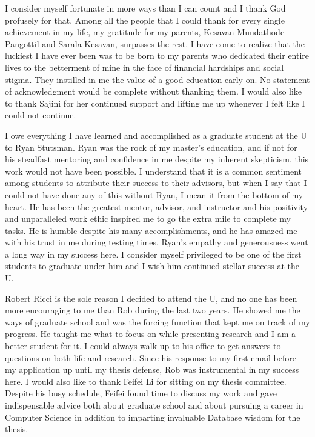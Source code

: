 I consider myself fortunate in more ways than I can count and I thank God profusely for that. 
Among all the people that I could thank for every single achievement in my life, my gratitude for my parents, Kesavan Mundathode Pangottil and Sarala Kesavan, surpasses the rest. 
I have come to realize that the luckiest I have ever been was to be born to my parents who dedicated their entire lives to the betterment of mine in the face of financial hardships and social stigma. 
They instilled in me the value of a good education early on. No statement of acknowledgment would be complete without thanking them. I would also like to thank Sajini for her continued support and lifting 
me up whenever I felt like I could not continue.

I owe everything I have learned and accomplished as a graduate student at the U to Ryan Stutsman. 
Ryan was the rock of my master's education, and if not for his steadfast mentoring and confidence in me despite my inherent skepticism, this work would not have been possible. 
I understand that it is a common sentiment among students to attribute their success to their advisors, but when I say that I could not have done any of this without Ryan, I mean it from the bottom of my heart. 
He has been the greatest mentor, advisor, and instructor and his positivity and unparalleled work ethic inspired me to go the extra mile to complete my tasks. 
He is humble despite his many accomplishments, and he has amazed me with his trust in me during testing times. 
Ryan's empathy and generousness went a long way in my success here. 
I consider myself privileged to be one of the first students to graduate under him and I wish him continued stellar success at the U.

Robert Ricci is the sole reason I decided to attend the U, and no one has been more \linebreak encouraging to me than Rob during the last two years.
He showed me the ways of \linebreak graduate school and was the forcing function that kept me on track of my progress. 
He taught me what to focus on while presenting research and I am a better student for it.\linebreak 
I could always walk up to his office to get answers to questions on both life and research. 
Since his response to my first email before my application up until my thesis defense, \linebreak Rob was instrumental in my success here. 
I would also like to thank Feifei Li for sitting on my thesis committee. Despite his busy schedule, Feifei found time to discuss my work and gave indispensable advice both about graduate school and about pursuing a career in Computer Science in addition to imparting invaluable Database wisdom for the thesis.

